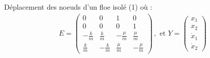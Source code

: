 \begin{frame}{Déplacement des noeuds d’un floe isolé (1)}
{{            où :
            \begin{align*}
                E = \begin{pmatrix}
                    0 & 0 & 1 & 0 \\ 0 & 0& 0& 1 \\ -\frac{k}{m} & \frac{k}{m} & -\frac{\mu}{m} & \frac{\mu}{m} \\ \frac{k}{m} & -\frac{k}{m} & \frac{\mu}{m} & -\frac{\mu}{m}
                \end{pmatrix} \,,
                \text{ et } Y = \begin{pmatrix} x_1 \\ x_2 \\ \dot{x}_1 \\ \dot{x}_2 \end{pmatrix} 
            \end{align*}
        }
    }

    
\end{frame}


